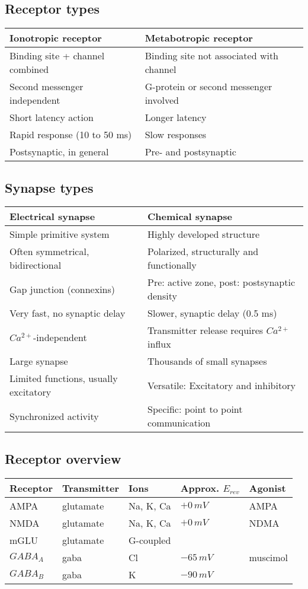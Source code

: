 \documentclass[main]{subfiles}
\begin{document}
\subsection{Receptor types}
\begin{tabular}{|l|l|}
	\hline
	\textbf{Ionotropic receptor} & \textbf{Metabotropic receptor}\\\hline
	Binding site + channel combined & Binding site not associated with channel\\\hline
	Second messenger independent & G-protein or second messenger involved\\\hline
	Short latency action & Longer latency\\\hline
	Rapid response (10 to 50 ms) & Slow responses\\\hline
	Postsynaptic, in general & Pre- and postsynaptic\\\hline
\end{tabular}

\subsection{Synapse types}
\begin{tabular}{|l|l|}
	\hline
	\textbf{Electrical synapse} & \textbf{Chemical synapse}\\\hline
	Simple primitive system & Highly developed structure\\\hline
	Often symmetrical, bidirectional & Polarized, structurally and functionally\\\hline
	Gap junction (connexins) & Pre: active zone, post: postsynaptic density\\\hline
	Very fast, no synaptic delay & Slower, synaptic delay (0.5 ms)\\\hline
	$Ca^{2+}$-independent & Transmitter release requires $Ca^{2+}$ influx\\\hline
	Large synapse & Thousands of small synapses\\\hline
	Limited functions, usually excitatory & Versatile: Excitatory and inhibitory\\\hline
	Synchronized activity & Specific: point to point communication\\\hline
\end{tabular}

\subsection{Receptor overview}
\begin{tabular}{|l|l|l|l|l|}
	\hline
	\textbf{Receptor} & \textbf{Transmitter} & \textbf{Ions} & \textbf{Approx. $E_{rev}$} & \textbf{Agonist}\\\hline
	AMPA & glutamate & Na, K, Ca & $+0\,mV$ & AMPA\\\hline
	NMDA & glutamate & Na, K, Ca & $+0\,mV$ & NDMA\\\hline
	mGLU & glutamate & G-coupled & & \\\hline
	$GABA_A$ & gaba & Cl & $-65\,mV$ & muscimol\\\hline
	$GABA_B$ & gaba & K & $-90\,mV$ & \\\hline
\end{tabular}
\end{document}

